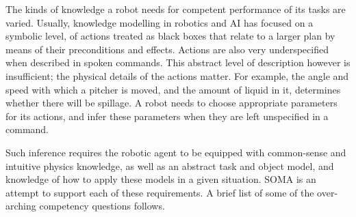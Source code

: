 The kinds of knowledge a robot needs for competent performance of its tasks are varied. Usually, knowledge modelling in robotics and AI has focused on a symbolic level, of actions treated as black boxes that relate to a larger plan by means of their preconditions and effects. Actions are also very underspecified when described in spoken commands. This abstract level of description however is insufficient; the physical details of the actions matter. For example, the angle and speed with which a pitcher is moved, and the amount of liquid in it, determines whether there will be spillage. A robot needs to choose appropriate parameters for its actions, and infer these parameters when they are left unspecified in a command.

Such inference requires the robotic agent to be equipped with common-sense and intuitive physics knowledge, as well as an abstract task and object model, and knowledge of how to apply these models in a given situation. SOMA is an attempt to support each of these requirements. A brief list of some of the over-arching competency questions follows.


